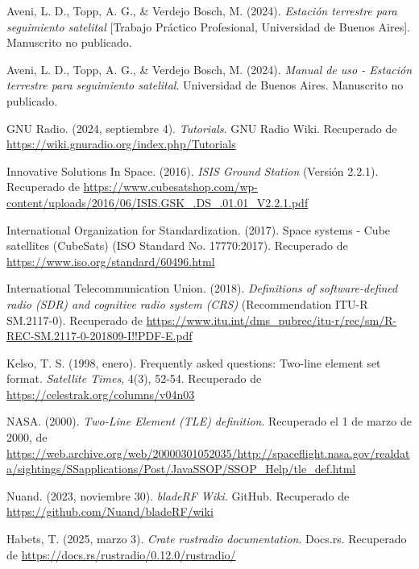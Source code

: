 Aveni, L. D., Topp, A. G., \& Verdejo Bosch, M. (2024). \textit{Estación terrestre para seguimiento satelital} [Trabajo Práctico Profesional, Universidad de Buenos Aires]. Manuscrito no publicado.

Aveni, L. D., Topp, A. G., \& Verdejo Bosch, M. (2024). \textit{Manual de uso - Estación terrestre para seguimiento satelital}. Universidad de Buenos Aires. Manuscrito no publicado.

GNU Radio. (2024, septiembre 4). \textit{Tutorials}. GNU Radio Wiki. Recuperado de \url{https://wiki.gnuradio.org/index.php/Tutorials}

Innovative Solutions In Space. (2016). \textit{ISIS Ground Station} (Versión 2.2.1). Recuperado de \url{https://www.cubesatshop.com/wp-content/uploads/2016/06/ISIS.GSK\_.DS\_.01.01\_V2.2.1.pdf}

International Organization for Standardization. (2017). Space systems - Cube satellites (CubeSats) (ISO Standard No. 17770:2017). Recuperado de \url{https://www.iso.org/standard/60496.html}

International Telecommunication Union. (2018). \textit{Definitions of software-defined radio (SDR) and cognitive radio system (CRS)} (Recommendation ITU-R SM.2117-0). Recuperado de \url{https://www.itu.int/dms\_pubrec/itu-r/rec/sm/R-REC-SM.2117-0-201809-I!!PDF-E.pdf}

Kelso, T. S. (1998, enero). Frequently asked questions: Two-line element set format. \textit{Satellite Times}, 4(3), 52-54. Recuperado de \url{https://celestrak.org/columns/v04n03}

NASA. (2000). \textit{Two-Line Element (TLE) definition}. Recuperado el 1 de marzo de 2000, de \url{https://web.archive.org/web/20000301052035/http://spaceflight.nasa.gov/realdata/sightings/SSapplications/Post/JavaSSOP/SSOP_Help/tle_def.html}

Nuand. (2023, noviembre 30). \textit{bladeRF Wiki}. GitHub. Recuperado de \url{https://github.com/Nuand/bladeRF/wiki}

Habets, T. (2025, marzo 3). \textit{Crate rustradio documentation}. Docs.rs. Recuperado de \url{https://docs.rs/rustradio/0.12.0/rustradio/}
